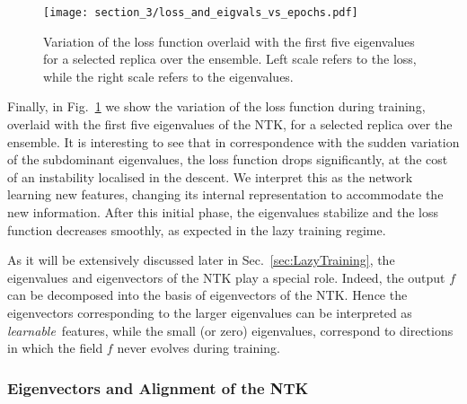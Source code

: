 \begin{figure}[t]
  \centering
  \texttt{[image: section\_3/loss\_and\_eigvals\_vs\_epochs.pdf]}  
  \caption{Variation of the loss function overlaid with the first five
  eigenvalues for a selected replica over the ensemble. Left scale refers to the
  loss, while the right scale refers to the eigenvalues.}
  \label{fig:Loss}
\end{figure}

Finally, in Fig.~\ref{fig:Loss} we show the variation of the loss function
during training, overlaid with the first five eigenvalues of the NTK, for a
selected replica over the ensemble. It is interesting to see that in
correspondence with the sudden variation of the subdominant eigenvalues, the
loss function drops significantly, at the cost of an instability localised in
the descent. We interpret this as the network learning new features, changing
its internal representation to accommodate the new information. After this
initial phase, the eigenvalues stabilize and the loss function decreases
smoothly, as expected in the lazy training regime.

As it will be extensively discussed later in Sec.~\ref{sec:LazyTraining}, the
eigenvalues and eigenvectors of the NTK play a special role. Indeed, the output
$f$ can be decomposed into the basis of eigenvectors of the NTK. Hence the
eigenvectors corresponding to the larger eigenvalues can be interpreted as {\em
learnable}\ features, while the small (or zero) eigenvalues, correspond to
directions in which the field $f$ never evolves during training.


\subsubsection{Eigenvectors and Alignment of the NTK}
\label{sec:NTKAlign}

